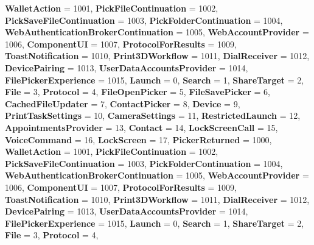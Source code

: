 \begin{DoxyCompactItemize}
{\bfseries Wallet\+Action} = 1001, 
{\bfseries Pick\+File\+Continuation} = 1002, 
{\bfseries Pick\+Save\+File\+Continuation} = 1003, 
{\bfseries Pick\+Folder\+Continuation} = 1004, 
\newline
{\bfseries Web\+Authentication\+Broker\+Continuation} = 1005, 
{\bfseries Web\+Account\+Provider} = 1006, 
{\bfseries Component\+UI} = 1007, 
{\bfseries Protocol\+For\+Results} = 1009, 
\newline
{\bfseries Toast\+Notification} = 1010, 
{\bfseries Print3\+D\+Workflow} = 1011, 
{\bfseries Dial\+Receiver} = 1012, 
{\bfseries Device\+Pairing} = 1013, 
\newline
{\bfseries User\+Data\+Accounts\+Provider} = 1014, 
{\bfseries File\+Picker\+Experience} = 1015, 
{\bfseries Launch} = 0, 
{\bfseries Search} = 1, 
\newline
{\bfseries Share\+Target} = 2, 
{\bfseries File} = 3, 
{\bfseries Protocol} = 4, 
{\bfseries File\+Open\+Picker} = 5, 
\newline
{\bfseries File\+Save\+Picker} = 6, 
{\bfseries Cached\+File\+Updater} = 7, 
{\bfseries Contact\+Picker} = 8, 
{\bfseries Device} = 9, 
\newline
{\bfseries Print\+Task\+Settings} = 10, 
{\bfseries Camera\+Settings} = 11, 
{\bfseries Restricted\+Launch} = 12, 
{\bfseries Appointments\+Provider} = 13, 
\newline
{\bfseries Contact} = 14, 
{\bfseries Lock\+Screen\+Call} = 15, 
{\bfseries Voice\+Command} = 16, 
{\bfseries Lock\+Screen} = 17, 
\newline
{\bfseries Picker\+Returned} = 1000, 
{\bfseries Wallet\+Action} = 1001, 
{\bfseries Pick\+File\+Continuation} = 1002, 
{\bfseries Pick\+Save\+File\+Continuation} = 1003, 
\newline
{\bfseries Pick\+Folder\+Continuation} = 1004, 
{\bfseries Web\+Authentication\+Broker\+Continuation} = 1005, 
{\bfseries Web\+Account\+Provider} = 1006, 
{\bfseries Component\+UI} = 1007, 
\newline
{\bfseries Protocol\+For\+Results} = 1009, 
{\bfseries Toast\+Notification} = 1010, 
{\bfseries Print3\+D\+Workflow} = 1011, 
{\bfseries Dial\+Receiver} = 1012, 
\newline
{\bfseries Device\+Pairing} = 1013, 
{\bfseries User\+Data\+Accounts\+Provider} = 1014, 
{\bfseries File\+Picker\+Experience} = 1015, 
{\bfseries Launch} = 0, 
\newline
{\bfseries Search} = 1, 
{\bfseries Share\+Target} = 2, 
{\bfseries File} = 3, 
{\bfseries Protocol} = 4, 
\newline

\end{DoxyCompactItemize}
